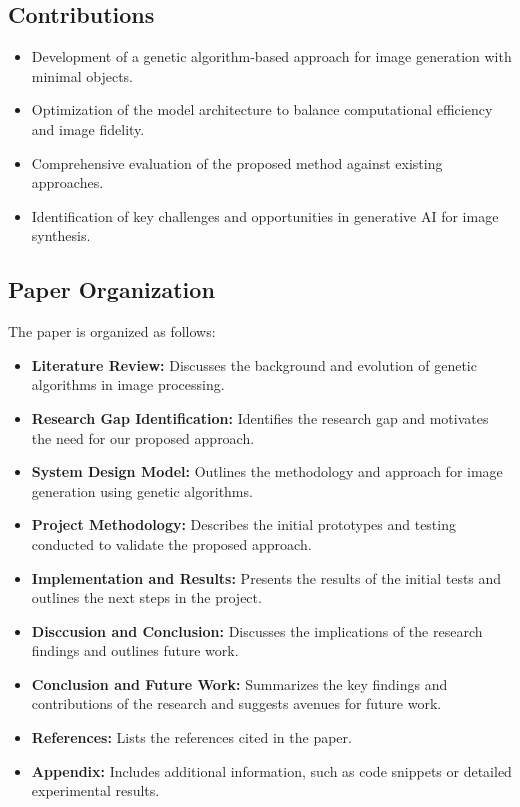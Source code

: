 \documentclass[10pt, conference]{IEEEtran}
\begin{document}
\subsection{Contributions}
\begin{itemize}
	\item Development of a genetic algorithm-based approach for image generation with minimal objects.
	\item Optimization of the model architecture to balance computational efficiency and image fidelity.
	\item Comprehensive evaluation of the proposed method against existing approaches.
	\item Identification of key challenges and opportunities in generative AI for image synthesis.
\end{itemize}

\subsection{Paper Organization}
The paper is organized as follows:
\begin{itemize}
	\item \textbf{Literature Review:} Discusses the background and evolution of genetic algorithms in image processing.
	\item \textbf{Research Gap Identification:} Identifies the research gap and motivates the need for our proposed approach.
	\item \textbf{System Design Model:} Outlines the methodology and approach for image generation using genetic algorithms.
	\item \textbf{Project Methodology:} Describes the initial prototypes and testing conducted to validate the proposed approach.
	\item \textbf{Implementation and Results:} Presents the results of the initial tests and outlines the next steps in the project.
	\item \textbf{Disccusion and Conclusion:} Discusses the implications of the research findings and outlines future work.
	\item \textbf{Conclusion and Future Work:} Summarizes the key findings and contributions of the research and suggests avenues for future work.
	\item \textbf{References:} Lists the references cited in the paper.
	\item \textbf{Appendix:} Includes additional information, such as code snippets or detailed experimental results.
\end{itemize}
\end{document}
